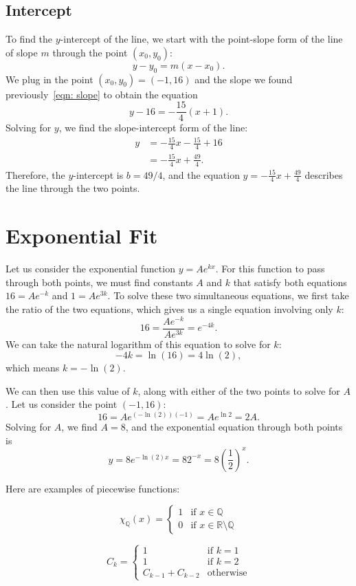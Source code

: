 \documentclass[10pt]{article}         %
\begin{document}
\subsection{Intercept}
\label{sec: intercept}

To find the $y$-intercept of the line, we start with the point-slope form of
the line of slope $m$ through the point $(x_0, y_0)$:
$$
	y - y_0 = m (x - x_0)
	.
$$
We plug in the point $(x_0, y_0) = (-1, 16)$ and the slope we found
previously~\eqref{eqn: slope} to obtain the equation
$$
	y - 16 = - \frac{15}{4} (x + 1)
	.
$$
Solving for $y$, we find the slope-intercept form of the line:
\begin{align*}
	y 
	&= - \frac{15}{4} x - \frac{15}{4} + 16 \\
	&= - \frac{15}{4} x + \frac{49}{4}
	.
\end{align*}
Therefore, the $y$-intercept is $b = 49/4$, and the equation 
$y = - \frac{15}{4} x + \frac{49}{4}$ describes the line through the two
points.

\section{Exponential Fit}
\label{sec: exponential fit}

Let us consider the exponential function $y = A e^{k x}$.  For this function
to pass through both points, we must find constants $A$ and $k$ that satisfy
both equations $16 = A e^{-k}$ and $1 = A e^{3 k}$.  To solve these two
simultaneous equations, we first take the ratio of the two equations, which
gives us a single equation involving only $k$:
$$
	16
	= \frac{A e^{-k}}{A e^{3 k}}
	= e^{-4 k}
	.
$$
We can take the natural logarithm of this equation to solve for $k$:
$$
	-4k = \ln(16) = 4 \ln (2)
	,
$$
which means $k = - \ln(2)$.

We can then use this value of $k$, along with either of the two points to
solve for $A$.  Let us consider the point $(-1, 16)$:
$$
	16 = A e^{(-\ln(2))(-1)} = A e^{\ln{2}} = 2 A
	.
$$
Solving for $A$, we find $A = 8$, and the exponential equation through both
points is
$$
	y
	= 8 e^{-\ln(2) x}
	= 8 2^{-x}
	= 8 \left( \frac{1}{2} \right)^x
	.
$$

Here are examples of piecewise functions:

\begin{equation}
\chi_{\mathbb{Q}}(x)=
    \begin{cases}
        1 & \text{if } x \in \mathbb{Q}\\
        0 & \text{if } x \in \mathbb{R}\setminus\mathbb{Q}
    \end{cases}
\end{equation}

\begin{equation}
    C_{k} =
    \begin{cases}
        1 & \text{if } k = 1\\
        1 & \text{if } k = 2\\
        C_{k-1} + C_{k-2} & \text{otherwise}
    \end{cases}
\end{equation}
\end{document}
